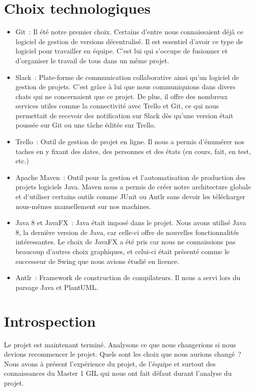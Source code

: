 \documentclass[hidelinks, 10pt,a4paper]{article}
\begin{document}
\section{Choix technologiques}  
  \begin{itemize}
   \item Git~:
    Il été notre premier choix. Certains d'entre nous connaissaient déjà ce logiciel de gestion de versions décentralisé.
    Il est essentiel d'avoir ce type de logiciel pour travailler en équipe. C'est lui qui s'occupe de fusionner et d'organiser le travail de tous dans un même projet.
   \item Slack~:
     Plate-forme de communication collaborative ainsi qu'un logiciel de gestion de projets. C'est grâce à lui que nous communiquions dans 
    divers chats qui ne concernaient que ce projet. De plus, il offre des nombreux services utiles comme la connectivité avec Trello et Git, ce qui nous permettait de recevoir des notification sur Slack dès qu'une version était poussée sur Git ou une tâche éditée sur Trello.
   \item Trello~:
    Outil de gestion de projet en ligne. Il nous a permis d'énumérer nos taches en y fixant des dates, des personnes et des états (en cours, fait, en test, etc.)
   \item Apache Maven~:
    Outil pour la gestion et l'automatisation de production des projets logiciels Java. Maven nous a permis de créer notre architecture globale
    et d'utiliser certains outils comme JUnit ou Antlr sans devoir les télécharger nous-mêmes manuellement sur nos machines.
   \item Java 8 et JavaFX~:
    Java était imposé dans le projet. Nous avons utilisé Java 8, la dernière version de Java, car celle-ci offre de nouvelles fonctionnalités intéressantes.
    Le choix de JavaFX a été pris car nous 
    ne connaissions pas beaucoup d'autres choix graphiques, et celui-ci était présenté comme le successeur de Swing que nous avions étudié en licence.
   \item Antlr~:
    Framework de construction de compilateurs. Il nous a servi lors du parsage Java et PlantUML.
  \end{itemize}

\section{Introspection}
Le projet est maintenant terminé. Analysons ce que nous changerions si nous devions recommencer le projet.
Quels sont les choix que nous aurions changé~?\newline
Nous avons à présent l'expérience du projet, de l'équipe et surtout des connaissances du Master 1 GIL qui nous ont fait défaut durant l'analyse du projet.
\newline
\end{document}
